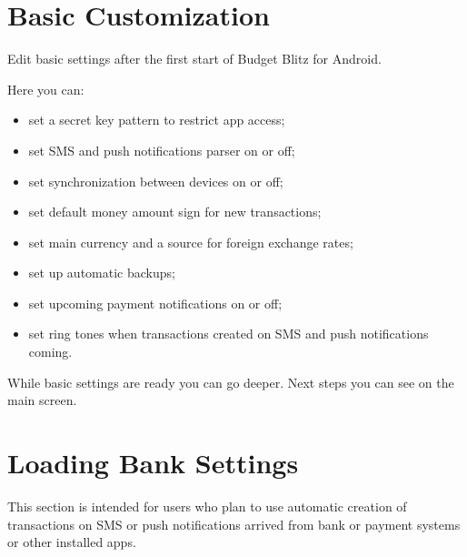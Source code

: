 \documentclass[a4paper,10pt,english]{sphinxmanual}
\begin{document}
\section{Basic Customization}
\label{\detokenize{getting-started:basic-customization}}
\sphinxAtStartPar
Edit basic settings after the first start of Budget Blitz for Android.

\noindent{}

\noindent{}

\noindent{}

\sphinxAtStartPar
Here you can:
\begin{itemize}
\item {} 
\sphinxAtStartPar
set a secret key pattern to restrict app access;

\item {} 
\sphinxAtStartPar
set SMS and push notifications parser on or off;

\item {} 
\sphinxAtStartPar
set synchronization between devices on or off;

\item {} 
\sphinxAtStartPar
set default money amount sign for new transactions;

\item {} 
\sphinxAtStartPar
set main currency and a source for foreign exchange rates;

\item {} 
\sphinxAtStartPar
set up automatic backups;

\item {} 
\sphinxAtStartPar
set upcoming payment notifications on or off;

\item {} 
\sphinxAtStartPar
set ring tones when transactions created on SMS and push notifications coming.

\end{itemize}

\sphinxAtStartPar
While basic settings are ready you can go deeper. Next steps you can see on the main screen.


\section{Loading Bank Settings}
\label{\detokenize{getting-started:loading-bank-settings}}
\sphinxAtStartPar
This section is intended for users who plan to use automatic creation of transactions on SMS or push notifications arrived
from bank or payment systems or other installed apps.
\end{document}
